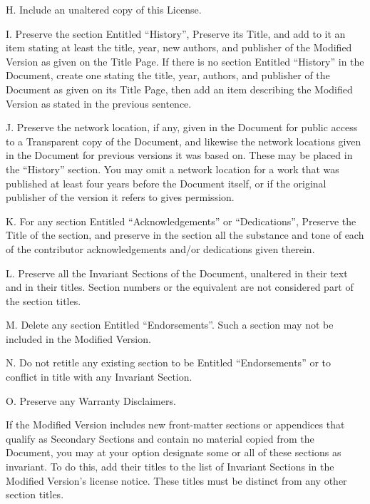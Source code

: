 {\tiny{}H. Include an unaltered copy of this License.}{\tiny\par}

{\tiny{}I. Preserve the section Entitled \textsf{``}History\textsf{''}, Preserve its
Title, and add to it an item stating at least the title, year, new
authors, and publisher of the Modified Version as given on the Title
Page. If there is no section Entitled \textquotedblleft History\textquotedblright{}
in the Document, create one stating the title, year, authors, and
publisher of the Document as given on its Title Page, then add an
item describing the Modified Version as stated in the previous sentence.}{\tiny\par}

{\tiny{}J. Preserve the network location, if any, given in the Document
for public access to a Transparent copy of the Document, and likewise
the network locations given in the Document for previous versions
it was based on. These may be placed in the \textsf{``}History\textsf{''} section.
You may omit a network location for a work that was published at least
four years before the Document itself, or if the original publisher
of the version it refers to gives permission.}{\tiny\par}

{\tiny{}K. For any section Entitled \textsf{``}Acknowledgements\textsf{''} or \textsf{``}Dedications\textsf{''},
Preserve the Title of the section, and preserve in the section all
the substance and tone of each of the contributor acknowledgements
and/or dedications given therein.}{\tiny\par}

{\tiny{}L. Preserve all the Invariant Sections of the Document, unaltered
in their text and in their titles. Section numbers or the equivalent
are not considered part of the section titles.}{\tiny\par}

{\tiny{}M. Delete any section Entitled \textsf{``}Endorsements\textsf{''}. Such a
section may not be included in the Modified Version.}{\tiny\par}

{\tiny{}N. Do not retitle any existing section to be Entitled \textsf{``}Endorsements\textsf{''}
or to conflict in title with any Invariant Section.}{\tiny\par}

{\tiny{}O. Preserve any Warranty Disclaimers.}{\tiny\par}

{\tiny{}If the Modified Version includes new front-matter sections
or appendices that qualify as Secondary Sections and contain no material
copied from the Document, you may at your option designate some or
all of these sections as invariant. To do this, add their titles to
the list of Invariant Sections in the Modified Version\textsf{'}s license notice.
These titles must be distinct from any other section titles.}{\tiny\par}

